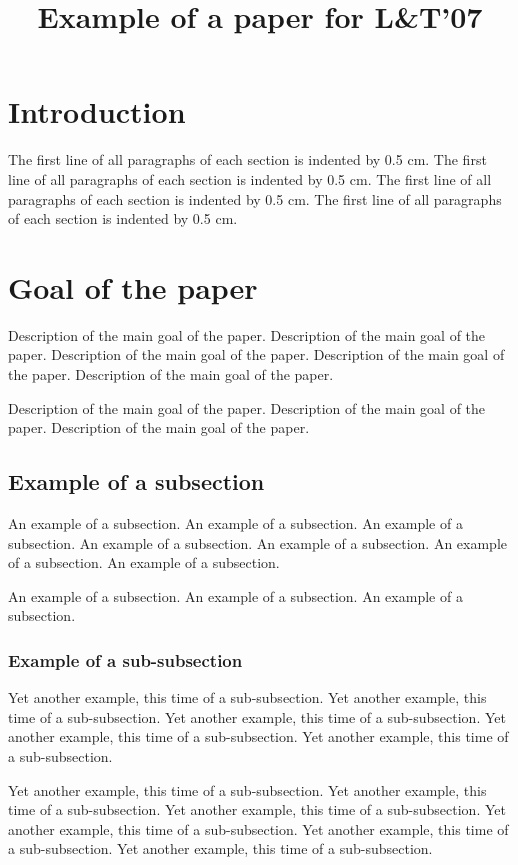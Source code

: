 \documentclass[10pt, a4paper]{article}
\title{Example of a paper for L\&T'07}
\begin{document}
\maketitleabstract

\section{Introduction}

The first line of all paragraphs of each section is indented by 0.5 cm. The first line of all paragraphs of each section is indented by 0.5 cm. The first line of all paragraphs of each section is indented by 0.5 cm. The first line of all paragraphs of each section is indented by 0.5 cm.

\section{Goal of the paper}

Description of the main goal of the paper. Description of the main goal of the paper. Description of the main goal of the paper. Description of the main goal of the paper. Description of the main goal of the paper.

Description of the main goal of the paper. Description of the main goal of the paper. Description of the main goal of the paper.

\subsection{Example of a subsection}

An example of a subsection. An example of a subsection. An example of a subsection. An example of a subsection. An example of a subsection. An example of a subsection. An example of a subsection.

An example of a subsection. An example of a subsection. An example of a subsection.

\subsubsection{Example of a sub-subsection} 
Yet another example, this time of a sub-subsection. Yet another example, this time of a sub-subsection. Yet another example, this time of a sub-subsection. Yet another example, this time of a sub-subsection. Yet another example, this time of a sub-subsection.

Yet another example, this time of a sub-subsection. Yet another example, this time of a sub-subsection. Yet another example, this time of a sub-subsection. Yet another example, this time of a sub-subsection. Yet another example, this time of a sub-subsection. Yet another example, this time of a sub-subsection.
\end{document}
